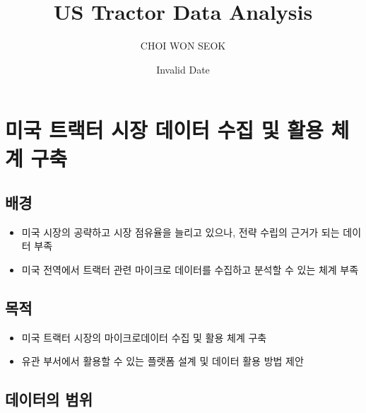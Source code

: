 \documentclass[
  1.1em,
  letterpaper,
  DIV=11,
  numbers=noendperiod]{scrartcl}
\title{US Tractor Data Analysis}
\author{CHOI WON SEOK}
\date{Invalid Date}
\renewcommand*\contentsname{Table of contents}
\newcommand\contentsname{Table of contents}
\begin{document}
\maketitle

\renewcommand*\contentsname{Table of contents}
{
\hypersetup{linkcolor=}
\setcounter{tocdepth}{3}
\tableofcontents
}
\section{미국 트랙터 시장 데이터 수집 및 활용 체계
구축}\label{uxbbf8uxad6d-uxd2b8uxb799uxd130-uxc2dcuxc7a5-uxb370uxc774uxd130-uxc218uxc9d1-uxbc0f-uxd65cuxc6a9-uxccb4uxacc4-uxad6cuxcd95}

\subsection{배경}\label{uxbc30uxacbd}

\begin{itemize}
\item
  미국 시장의 공략하고 시장 점유율을 늘리고 있으나, 전략 수립의 근거가
  되는 데이터 부족
\item
  미국 전역에서 트랙터 관련 마이크로 데이터를 수집하고 분석할 수 있는
  체계 부족
\end{itemize}

\subsection{목적}\label{uxbaa9uxc801}

\begin{itemize}
\item
  미국 트랙터 시장의 마이크로데이터 수집 및 활용 체계 구축
\item
  유관 부서에서 활용할 수 있는 플랫폼 설계 및 데이터 활용 방법 제안
\end{itemize}

\subsection{데이터의 범위}\label{uxb370uxc774uxd130uxc758-uxbc94uxc704}
\end{document}

